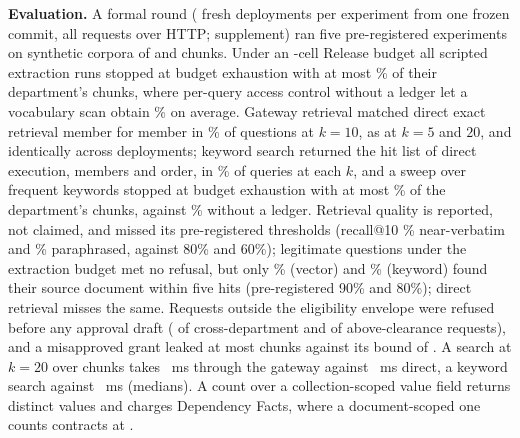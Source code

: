 \documentclass[10pt,journal,compsoc]{IEEEtran}
\newcommand{\code}[1]{\texttt{\detokenize{#1}}}
\begin{document}
\textbf{Evaluation.} A formal round (\KbEkbOneDeployments{} fresh
deployments per experiment from one frozen commit, all requests over HTTP;
supplement) ran five pre-registered experiments on synthetic
corpora of \KbEkbThreeFortyEightKChunks{} and \KbEkbThreeNinetySixKChunks{}
chunks. Under an \KbEkbOneReleaseBudget{}-cell Release budget all
\KbEkbOneFactGateRunsTotal{} scripted extraction runs stopped at budget
exhaustion with at most \KbEkbOneFactGateSOneLeakMaxPct\% of their
department's chunks, where per-query access control without a ledger let a
vocabulary scan obtain \KbEkbOneAclSOneLeakMeanPct\% on average. Gateway
retrieval matched direct exact retrieval member for member in
\KbEkbFourIdentityKTen\% of \KbEkbFourQueries{} questions at $k=10$, as at
$k=5$ and $20$, and identically across deployments; keyword search returned the hit list of
direct \code{LIKE} execution, members and order, in
\KbEkbSixIdentityKTen\% of \KbEkbSixObservationsKTen{} queries at each $k$,
and a sweep over frequent keywords stopped at budget exhaustion with at most
\KbEkbSevenFactGateLeakMaxPct\% of the department's chunks, against
\KbEkbSevenAclLeakMeanPct\% without a ledger. Retrieval quality is
reported, not claimed, and missed its pre-registered thresholds (recall@10
\KbEkbFourRecallVerbatimKTen\% near-verbatim and
\KbEkbFourRecallParaphraseKTen\% paraphrased, against 80\% and 60\%);
legitimate questions under the extraction budget met no refusal, but only
\KbEkbOneLegitCompletionPct\% (vector) and \KbEkbSevenLegitCompletionPct\%
(keyword) found their source document within five hits (pre-registered 90\%
and 80\%); direct retrieval misses the same. Requests outside the
eligibility envelope were refused before any approval draft
(\KbEkbTwoOtherDeptNotEligible{} of \KbEkbTwoOtherDeptRequests{}
cross-department and \KbEkbTwoHigherClassificationNotEligible{} of
\KbEkbTwoHigherClassificationRequests{} above-clearance requests), and a
misapproved grant leaked at most \KbEkbTwoBLeakMax{} chunks against its
bound of \KbEkbTwoBLeakBound. A search at $k=20$ over
\KbEkbThreeNinetySixKChunks{} chunks takes
\KbEkbThreeNinetySixKSearchFactGateKTwentyNovelPFifty{}~ms through the
gateway against \KbEkbThreeNinetySixKSearchDirectKTwentyNovelPFifty{}~ms
direct, a keyword search
\KbEkbEightNinetySixKFactGateKTwentyNovelPFifty{} against
\KbEkbEightNinetySixKDirectKTwentyNovelPFifty{}~ms (medians). A count over a collection-scoped value field returns
\KbEkbFiveCollectionAnswer{} distinct values and charges
\KbEkbFiveCollectionInfluence{} Dependency Facts, where a document-scoped
one counts \KbEkbFiveDocumentAnswer{} contracts at
\KbEkbFiveDocumentInfluence.
\end{document}
